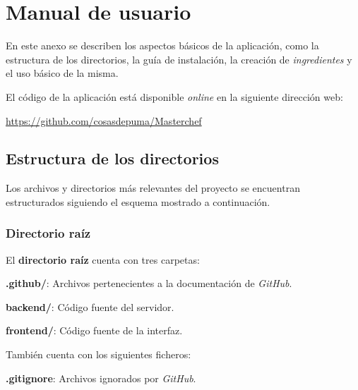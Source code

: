 

\chapter{Manual de usuario} \label{anx:manual}

En este anexo se describen los aspectos básicos de la aplicación, como la estructura de los directorios, la guía de instalación, la creación de \textit{ingredientes} y el uso básico de la misma.\sn

El código de la aplicación está disponible \textit{online} en la siguiente dirección web:\sn

\hfil\url{https://github.com/cosasdepuma/Masterchef}\hfil\n

\section{Estructura de los directorios} \label{sec:folderstructure}

Los archivos y directorios más relevantes del proyecto se encuentran estructurados siguiendo el esquema mostrado a continuación.\sn

\subsection{Directorio raíz} \label{sub:rootdir}

El \textbf{directorio raíz} cuenta con tres carpetas:\sn

\textbf{.github/}: Archivos pertenecientes a la documentación de \textit{GitHub}.

\textbf{backend/}: Código fuente del servidor.

\textbf{frontend/}: Código fuente de la interfaz.\sn

También cuenta con los siguientes ficheros:\sn

\textbf{.gitignore}: Archivos ignorados por \textit{GitHub}.

